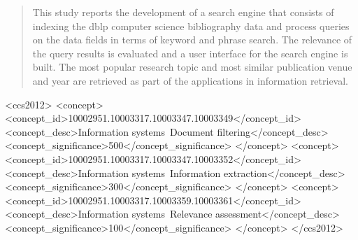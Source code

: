 \documentclass{sig-alternate-05-2015}
\begin{document}
%
\author{
%
%
\alignauthor Robert Pinsler \\
        \\
\alignauthor Yiding Liu \\
        \\
\alignauthor Yitong Guan \\
        \\
\and  %
\alignauthor Jenn Bing Ong \\
        \\
}


\maketitle
\begin{abstract}
This study reports the development of a search engine that consists of indexing the dblp computer science bibliography data and process queries on the data fields in terms of keyword and phrase search. The relevance of the query results is evaluated and a user interface for the search engine is built. The most popular research topic and most similar publication venue and year are retrieved as part of the applications in information retrieval. 
\end{abstract}


%
%
\begin{CCSXML}
<ccs2012>
<concept>
<concept_id>10002951.10003317.10003347.10003349</concept_id>
<concept_desc>Information systems~Document filtering</concept_desc>
<concept_significance>500</concept_significance>
</concept>
<concept>
<concept_id>10002951.10003317.10003347.10003352</concept_id>
<concept_desc>Information systems~Information extraction</concept_desc>
<concept_significance>300</concept_significance>
</concept>
<concept>
<concept_id>10002951.10003317.10003359.10003361</concept_id>
<concept_desc>Information systems~Relevance assessment</concept_desc>
<concept_significance>100</concept_significance>
</concept>
</ccs2012>
\end{CCSXML}
\end{document}
